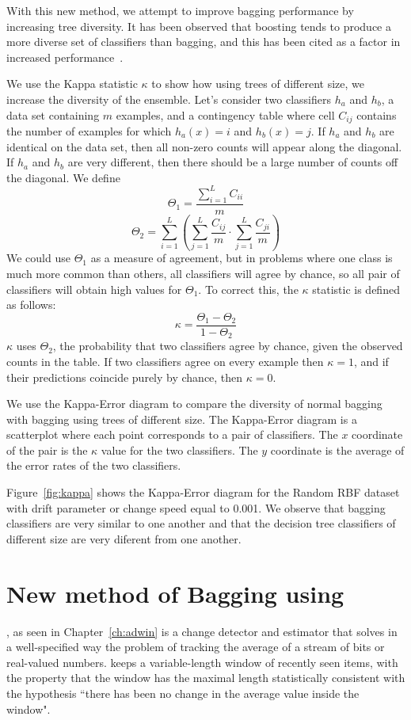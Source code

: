With this new method, we attempt to improve bagging performance by increasing tree diversity.
It has been observed that boosting tends to produce a more diverse set of classifiers
than bagging, and this has been cited as a factor in increased performance~\cite{MargineantuD97}.

We use the Kappa statistic $\kappa$ to show how using trees of different size, we increase
the diversity of the ensemble. 
Let's consider two classifiers $h_a$ and $h_b$, a data set containing $m$ examples, and
a contingency table where cell $C_{ij}$ contains the number of examples for which $h_a(x)=i$
and $h_b(x)=j$. If $h_a$ and $h_b$ are identical on the data set, then all non-zero counts 
will appear along the diagonal. If $h_a$ and $h_b$ are very different, then there should be
a large number of counts off the diagonal. We define
$$\Theta_1= \frac{\sum^{L}_{i=1} C_{ii}}{m}$$
$$\Theta_2 = \sum^L_{i=1} \left(  \sum^L_{j=1} \frac{C_{ij}}{m} \cdot \sum^L_{j=1}\frac{C_{ji}}{m} \right) $$
We could use $\Theta_1$ as a measure of agreement, but in problems where one class is much
more common than others, all classifiers will agree by chance, so all pair of classifiers
will obtain high values for $\Theta_1$. To correct this,
the $\kappa$ statistic is defined as follows:
$$ \kappa = \frac{\Theta_1 -\Theta_2}{1-\Theta_2}$$
$\kappa$ uses $\Theta_2$, the probability that two classifiers agree by chance, given the observed counts in the table.
If two classifiers agree on every example then $\kappa = 1 $, and if their predictions
coincide purely by chance, then $\kappa = 0$.



We use the Kappa-Error diagram to compare the diversity of normal bagging with bagging using trees
of different size. The Kappa-Error diagram is a scatterplot where each point corresponds to a pair
of classifiers. The $x$ coordinate of the pair is the $\kappa$ value for the two classifiers. 
The $y$ coordinate is the average of the error rates of the two classifiers.

Figure~\ref{fig:kappa} shows the Kappa-Error diagram for the Random RBF dataset with drift parameter or
change speed equal to 0.001.%
We observe that bagging classifiers are 
very similar to one another and that the decision tree classifiers of different size are very diferent from
one another.

\section{New method of Bagging using \adwin}%
\label{adwinbagging}
\adwinb\cite{bif-gav}, as seen in Chapter~\ref{ch:adwin} is a change detector and estimator that solves in a 
well-specified way the problem of tracking the average of a stream of bits or 
real-valued numbers. \adwin keeps a variable-length window of recently seen 
items, with the property that the window has the maximal length statistically 
consistent with the hypothesis ``there has been no change in the average value
inside the window". 

